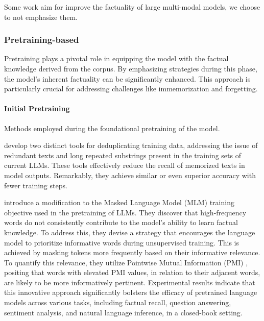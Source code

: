 
Some work \citep{liu2023mitigating,sun2023aligning} aim for improve the factuality of large multi-modal models, we choose to not emphasize them.

\subsubsection{Pretraining-based}
\label{sec:enhace_pure_pre}
Pretraining plays a pivotal role in equipping the model with the factual knowledge derived from the corpus. By emphasizing strategies during this phase, the model's inherent factuality can be significantly enhanced. This approach is particularly crucial for addressing challenges like immemorization and forgetting.


\paragraph{\textbf{Initial Pretraining}}
Methods employed during the foundational pretraining of the model.

\citet{lee-etal-2022-deduplicating} develop two distinct tools for deduplicating training data, addressing the issue of redundant texts and long repeated substrings present in the training sets of current LLMs. These tools effectively reduce the recall of memorized texts in model outputs. Remarkably, they achieve similar or even superior accuracy with fewer training steps.

\citet{sadeq-etal-2023-unsupervised} introduce a modification to the Masked Language Model (MLM) training objective used in the pretraining of LLMs. They discover that high-frequency words do not consistently contribute to the model's ability to learn factual knowledge. To address this, they devise a strategy that encourages the language model to prioritize informative words during unsupervised training. This is achieved by masking tokens more frequently based on their informative relevance. To quantify this relevance, they utilize Pointwise Mutual Information (PMI) \citep{PMI}, positing that words with elevated PMI values, in relation to their adjacent words, are likely to be more informatively pertinent. Experimental results indicate that this innovative approach significantly bolsters the efficacy of pretrained language models across various tasks, including factual recall, question answering, sentiment analysis, and natural language inference, in a closed-book setting.

